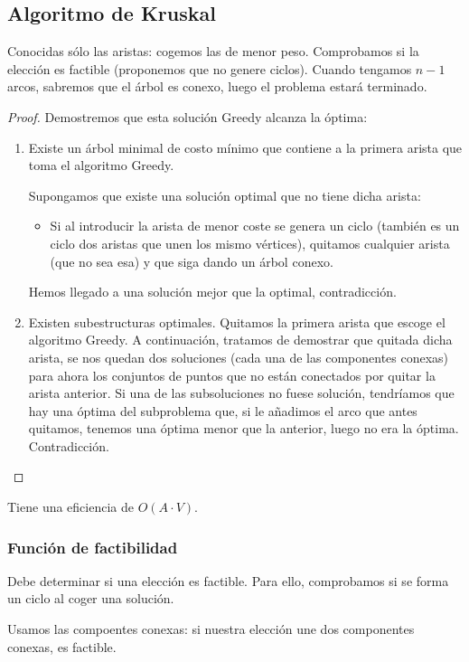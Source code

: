 \subsection{Algoritmo de Kruskal}
Conocidas sólo las aristas: cogemos las de menor peso. Comprobamos si la elección es factible (proponemos que no genere ciclos).
Cuando tengamos $n-1$ arcos, sabremos que el árbol es conexo, luego el problema estará terminado.
\begin{proof}
    Demostremos que esta solución Greedy alcanza la óptima:
    \begin{enumerate}
        \item 
        Existe un árbol minimal de costo mínimo que contiene a la primera arista que toma el algoritmo Greedy.

        Supongamos que existe una solución optimal que no tiene dicha arista:
        \begin{itemize}
            \item Si al introducir la arista de menor coste se genera un ciclo (también es un ciclo dos aristas que unen los mismo vértices), quitamos cualquier arista (que no sea esa) y que siga dando un árbol conexo.
        \end{itemize}
        Hemos llegado a una solución mejor que la optimal, contradicción.

        \item Existen subestructuras optimales.
            Quitamos la primera arista que escoge el algoritmo Greedy. A continuación, tratamos de demostrar que quitada dicha arista, se nos quedan dos soluciones (cada una de las componentes conexas) para ahora los conjuntos de puntos que no están conectados por quitar la arista anterior.
            Si una de las subsoluciones no fuese solución, tendríamos que hay una óptima del subproblema que, si le añadimos el arco que antes quitamos, tenemos una óptima menor que la anterior, luego no era la óptima. Contradicción.
    \end{enumerate}
\end{proof}

Tiene una eficiencia de $O(A\cdot V)$.

\subsubsection{Función de factibilidad}
Debe determinar si una elección es factible. Para ello, comprobamos si se forma un ciclo al coger una solución.

Usamos las compoentes conexas: si nuestra elección une dos componentes conexas, es factible.

